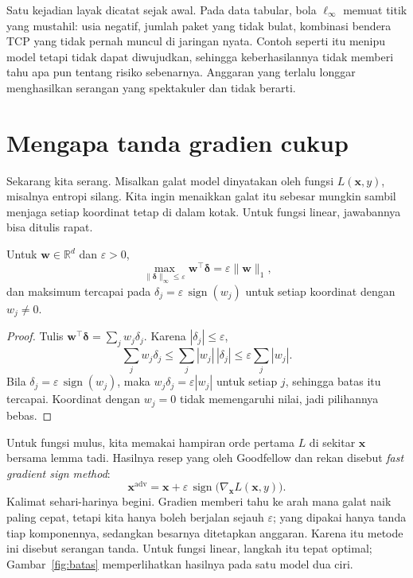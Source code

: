 Satu kejadian layak dicatat sejak awal. Pada data tabular, bola $\ell_\infty$ memuat
titik yang mustahil: usia negatif, jumlah paket yang tidak bulat, kombinasi bendera
TCP yang tidak pernah muncul di jaringan nyata. Contoh seperti itu menipu model tetapi
tidak dapat diwujudkan, sehingga keberhasilannya tidak memberi tahu apa pun tentang
risiko sebenarnya. Anggaran yang terlalu longgar menghasilkan serangan yang
spektakuler dan tidak berarti.

\section{Mengapa tanda gradien cukup}

Sekarang kita serang. Misalkan galat model dinyatakan oleh fungsi
$L(\mathbf{x},y)$, misalnya entropi silang. Kita ingin menaikkan galat itu sebesar
mungkin sambil menjaga setiap koordinat tetap di dalam kotak. Untuk fungsi linear,
jawabannya bisa ditulis rapat.


\begin{lemma}
Untuk $\mathbf{w}\in\mathbb{R}^{d}$ dan $\varepsilon>0$,
\[
  \max_{\lVert\boldsymbol{\delta}\rVert_\infty\le\varepsilon}
  \mathbf{w}^{\top}\boldsymbol{\delta}
  =\varepsilon\lVert\mathbf{w}\rVert_1,
\]
dan maksimum tercapai pada $\delta_j=\varepsilon\,\operatorname{sign}(w_j)$ untuk setiap
koordinat dengan $w_j\neq0$.
\end{lemma}

\begin{proof}
Tulis $\mathbf{w}^{\top}\boldsymbol{\delta}=\sum_j w_j\delta_j$. Karena
$|\delta_j|\le\varepsilon$,
\[
  \sum_j w_j\delta_j\le\sum_j|w_j|\,|\delta_j|\le\varepsilon\sum_j|w_j|.
\]
Bila $\delta_j=\varepsilon\,\operatorname{sign}(w_j)$, maka $w_j\delta_j=\varepsilon|w_j|$
untuk setiap $j$, sehingga batas itu tercapai. Koordinat dengan $w_j=0$ tidak
memengaruhi nilai, jadi pilihannya bebas.
\end{proof}

Untuk fungsi mulus, kita memakai hampiran orde pertama $L$ di sekitar $\mathbf{x}$
bersama lemma tadi. Hasilnya resep yang oleh Goodfellow dan rekan disebut
\emph{fast gradient sign method}:
\[
  \mathbf{x}^{\mathrm{adv}}
  =\mathbf{x}+\varepsilon\,\operatorname{sign}\bigl(\nabla_{\mathbf{x}}L(\mathbf{x},y)\bigr).
\]
Kalimat sehari-harinya begini. Gradien memberi tahu ke arah mana galat naik paling
cepat, tetapi kita hanya boleh berjalan sejauh $\varepsilon$; yang dipakai hanya tanda
tiap komponennya, sedangkan besarnya ditetapkan anggaran. Karena itu metode ini disebut
serangan tanda. Untuk fungsi linear, langkah itu tepat optimal; Gambar~\ref{fig:batas}
memperlihatkan hasilnya pada satu model dua ciri.

